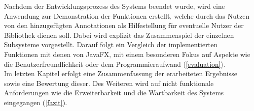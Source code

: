 Nachdem der Entwicklungsprozess des Systems beendet wurde, wird eine Anwendung zur Demonstration der Funktionen erstellt, welche durch das Nutzen von den hinzugefügten Annotationen als Hilfestellung für eventuelle Nutzer der Bibliothek dienen soll. Dabei wird explizit das Zusammenspiel der einzelnen Subsysteme vorgestellt. Darauf folgt ein Vergleich der implementierten Funktionen mit denen von JavaFX, mit einem besonderen Fokus auf Aspekte wie die Benutzerfreundlichkeit oder dem Programmieraufwand (\autoref{evaluation}).\\
Im letzten Kapitel erfolgt eine Zusammenfassung der erarbeiteten Ergebnisse sowie eine Bewertung dieser. Des Weiteren wird auf nicht funktionale Anforderungen wie die Erweiterbarkeit und die Wartbarkeit des Systems eingegangen (\autoref{fazit}).